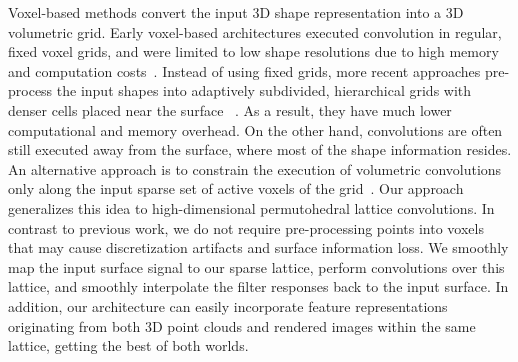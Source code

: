 \documentclass[10pt,twocolumn,letterpaper]{article}
\begin{document}
Voxel-based methods convert the input 3D shape representation into a 3D volumetric grid. Early voxel-based architectures executed convolution in regular, fixed voxel grids, and were limited to low shape resolutions due to high memory and computation costs~\cite{wu2015shapenets,maturana2015voxnets,qi2016volmv,brock2016anothervoxnet,garciagarcia2016pointnetwhichisvoxnetactually,sedaghat2017orion}. Instead of using fixed grids, more recent approaches pre-process the input shapes into adaptively subdivided, hierarchical grids with denser cells placed near the surface ~\cite{riegler2017octnet,riegler2017OctNetFusion,klokov2017escape,wang2017ocnn,tatarchenko2017octree}. As a result, they have much lower computational and memory overhead.  On the other hand, convolutions are often still executed away from the surface, where most of the shape information resides. An alternative approach is to constrain the execution of volumetric convolutions only along the input sparse set of active voxels of the grid~\cite{graham2017ssnet}. 
Our approach generalizes this idea to high-dimensional permutohedral lattice convolutions.
In contrast to previous work, we do not require pre-processing points into voxels that may cause discretization artifacts and surface information loss. We smoothly map the input surface signal to our sparse lattice, perform convolutions over this lattice, and smoothly interpolate the filter responses back to the input surface. In addition, our architecture can easily incorporate feature representations originating from both 3D point clouds and rendered images within the same lattice, getting the best of both worlds. 
\end{document}
